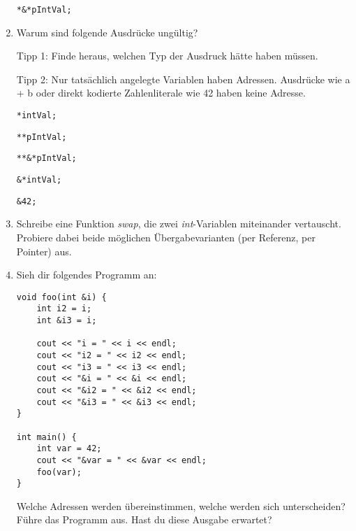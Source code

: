 \begin{enumerate}
\begin{lstlisting}
*&*pIntVal;
\end{lstlisting}


\item Warum sind folgende Ausdrücke ungültig?

Tipp 1: Finde heraus, welchen Typ der Ausdruck hätte haben müssen.

Tipp 2: Nur tatsächlich angelegte Variablen haben Adressen. Ausdrücke wie a + b oder direkt kodierte Zahlenliterale wie 42 haben keine Adresse.

\begin{lstlisting}
*intVal;
\end{lstlisting}

\begin{lstlisting}
**pIntVal;
\end{lstlisting}

\begin{lstlisting}
**&*pIntVal;
\end{lstlisting}

\begin{lstlisting}
&*intVal;
\end{lstlisting}

\begin{lstlisting}
&42;
\end{lstlisting}

\item Schreibe eine Funktion \emph{swap}, die zwei \emph{int}-Variablen miteinander vertauscht. 
Probiere dabei beide möglichen Übergabevarianten (per Referenz, per Pointer) aus. 

\item Sieh dir folgendes Programm an:

\begin{minipage}{\textwidth}
\begin{lstlisting}
void foo(int &i) {
	int i2 = i;
	int &i3 = i;
	
	cout << "i = " << i << endl;
	cout << "i2 = " << i2 << endl;
	cout << "i3 = " << i3 << endl;
	cout << "&i = " << &i << endl;
	cout << "&i2 = " << &i2 << endl;
	cout << "&i3 = " << &i3 << endl;
}

int main() {
	int var = 42;
	cout << "&var = " << &var << endl;
	foo(var);
}
\end{lstlisting}
\end{minipage}

Welche Adressen werden übereinstimmen, welche werden sich unterscheiden?
Führe das Programm aus.
Hast du diese Ausgabe erwartet?

\end{enumerate}

